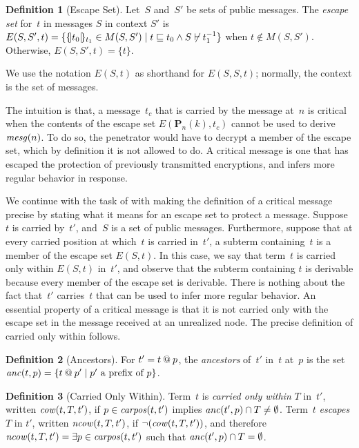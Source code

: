 \documentclass[12pt]{article}
\theoremstyle{definition}
\newtheorem{defn}{Definition}[section]
\newcommand{\pubmsg}{\mathbf{P}}
\newcommand{\carpos}{\fn{carpos}}
\newcommand{\anc}{\fn{anc}}
\newcommand{\mcow}{\fn{cow}}
\newcommand{\mncow}{\fn{ncow}}
\begin{document}
\begin{defn}[Escape Set]
Let~$S$ and~$S'$ be sets of public messages.
The \emph{escape set} for~$t$ in messages $S$ in context $S'$ is
$E(S,S',t)=\{\{\!|t_0|\!\}_{t_1}\in M(S,S') \mid
t\sqsubseteq t_0\wedge S\not\vdash t^{-1}_1\}$ when $t\notin M(S,S')$.
Otherwise, $E(S,S',t) = \{t \}$.
\end{defn}

We use the notation $E(S,t)$ as shorthand for $E(S,S,t)$; normally,
the context is the set of messages.

The intuition is that, a message~$t_c$ that is carried by the message
at~$n$ is critical when the contents of the escape set $E(\pubmsg_n(k),t_c)$
cannot be used to derive~$\operatorname{\mathit{mesg}}(n)$.  To do so, the penetrator would have
to decrypt a member of the escape set, which by definition it is not allowed
to do.  A critical message is one that has escaped the protection of
previously transmitted encryptions, and {\cpsa} infers more regular
behavior in response.

We continue with the task of with making the definition of a critical
message precise by stating what it means for an escape set to protect
a message.  Suppose~$t$ is carried by~$t'$, and~$S$ is a set of public
messages.  Furthermore, suppose that at every carried position at
which~$t$ is carried in~$t'$, a subterm containing~$t$ is a member of
the escape set $E(S,t)$.  In this case, we say that term~$t$ is
carried only within $E(S,t)$ in~$t'$, and observe that the subterm
containing $t$ is derivable because every member of the escape set is
derivable.  There is nothing about the fact that~$t'$ carries~$t$ that
can be used to infer more regular behavior.  An essential property of
a critical message is that it is not carried only with the escape set
in the message received at an unrealized node.  The precise definition
of carried only within follows.

\begin{defn}[Ancestors]
For $t'=t\mathbin{@} p$, the \emph{ancestors} of~$t'$ in~$t$ at~$p$ is the
set $\anc(t,p)=\{t\termat p'\mid \mbox{$p'$ a prefix
  of~$p$}\}$.
\end{defn}

\begin{defn}[Carried Only Within]
Term~$t$ is \emph{carried only within} $T$ in~$t'$, written
$\mcow(t,T,t')$, if $p\in\carpos(t,t')$ implies
$\anc(t',p)\cap T\neq\emptyset$. Term~$t$ \emph{escapes} $T$ in $t'$,
written $\mncow(t,T,t')$, if
$\lnot(\mcow(t,T,t'))$, and therefore $\mncow(t,T,t')=\some{p} \in
\carpos(t,t')$ such that $\anc(t',p)\cap T=\emptyset$.
\end{defn}
\end{document}
